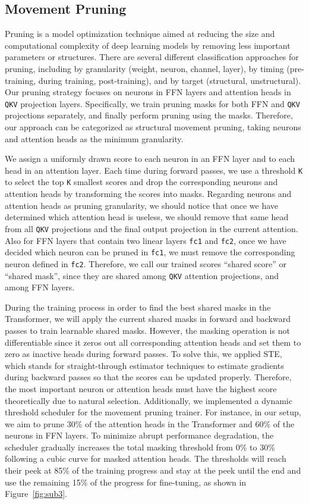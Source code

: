 \subsection{Movement Pruning}
Pruning is a model optimization technique aimed at reducing the size and computational complexity of deep learning models by removing less important parameters or structures. There are several different classification approaches for pruning, including by granularity (weight, neuron, channel, layer), by timing (pre-training, during training, post-training), and by target (structural, unstructural). Our pruning strategy focuses on neurons in FFN layers and attention heads in \texttt{QKV} projection layers. Specifically, we train pruning masks for both FFN and \texttt{QKV} projections separately, and finally perform pruning using the masks. Therefore, our approach can be categorized as structural movement pruning, taking neurons and attention heads as the minimum granularity.

We assign a uniformly drawn score to each neuron in an FFN layer and to each head in an attention layer. Each time during forward passes, we use a threshold \texttt{K} to select the top \texttt{K} smallest scores and drop the corresponding neurons and attention heads by transforming the scores into masks. Regarding neurons and attention heads as pruning granularity, we should notice that once we have determined which attention head is useless, we should remove that same head from all \texttt{QKV} projections and the final output projection in the current attention. Also for FFN layers that contain two linear layers \texttt{fc1} and \texttt{fc2}, once we have decided which neuron can be pruned in \texttt{fc1}, we must remove the corresponding neuron defined in \texttt{fc2}.  Therefore, we call our trained scores ``shared score'' or ``shared mask'', since they are shared among \texttt{QKV} attention projections, and among FFN layers.

During the training process in order to find the best shared masks in the Transformer, we will apply the current shared masks in forward and backward passes to train learnable shared masks. However, the masking operation is not differentiable since it zeros out all corresponding attention heads and set them to zero as inactive heads during forward passes. To solve this, we applied STE, which stands for straight-through estimator techniques to estimate gradients during backward passes so that the scores can be updated properly. Therefore, the most important neuron or attention heads must have the highest score theoretically due to natural selection. Additionally, we implemented a dynamic threshold scheduler for the movement pruning trainer. For instance, in our setup, we aim to prune 30\% of the attention heads in the Transformer and 60\% of the neurons in FFN layers. To minimize abrupt performance degradation, the scheduler gradually increases the total masking threshold from 0\% to 30\% following a cubic curve for masked attention heads. The thresholds will reach their peek at 85\% of the training progress and stay at the peek until the end and use the remaining 15\% of the progress for fine-tuning, as shown in Figure~\ref{fig:sub3}.

